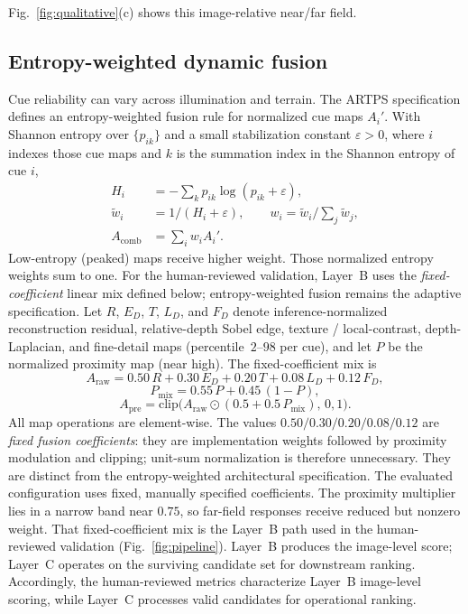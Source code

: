 Fig.~\ref{fig:qualitative}(c) shows this image-relative near/far field.

\subsection{Entropy-weighted dynamic fusion}
Cue reliability can vary across illumination and terrain.
The ARTPS specification defines an entropy-weighted fusion rule for normalized cue maps
\(A_i'\). With Shannon entropy over \(\{p_{ik}\}\) and a small stabilization constant
\(\varepsilon>0\), where \(i\) indexes those cue maps and \(k\) is the summation index in
the Shannon entropy of cue \(i\),
\[
\begin{aligned}
H_i&=-\sum_k p_{ik}\log(p_{ik}+\varepsilon),\\
\tilde w_i&=1/(H_i+\varepsilon),\qquad
w_i=\tilde w_i/\sum_j\tilde w_j,\\
A_{\mathrm{comb}}&=\sum_i w_i A_i'.
\end{aligned}
\]
Low-entropy (peaked) maps receive higher weight.
Those normalized entropy weights sum to one.
For the human-reviewed validation, Layer~B uses the \emph{fixed-coefficient} linear mix
defined below; entropy-weighted fusion remains the adaptive specification.
Let \(R\), \(E_D\), \(T\), \(L_D\), and \(F_D\) denote inference-normalized reconstruction
residual, relative-depth Sobel edge, texture / local-contrast, depth-Laplacian, and
fine-detail maps (percentile~$2$--$98$ per cue), and let \(P\) be the normalized proximity
map (near high).
The fixed-coefficient mix is
\[
A_{\mathrm{raw}}
=
0.50\,R + 0.30\,E_D + 0.20\,T + 0.08\,L_D + 0.12\,F_D,
\]
\[
P_{\mathrm{mix}}=0.55\,P+0.45\,(1-P),
\]
\[
A_{\mathrm{pre}}
=
\mathrm{clip}\!\bigl(A_{\mathrm{raw}}\odot(0.5+0.5\,P_{\mathrm{mix}}),\,0,1\bigr).
\]
All map operations are element-wise.
The values \(0.50/0.30/0.20/0.08/0.12\) are \emph{fixed fusion coefficients}: they are
implementation weights followed by proximity modulation and clipping; unit-sum normalization
is therefore unnecessary.
They are distinct from the entropy-weighted architectural specification.
The evaluated configuration uses fixed, manually specified coefficients.
The proximity multiplier lies in a narrow band near \(0.75\), so far-field responses receive
reduced but nonzero weight.
That fixed-coefficient mix is the Layer~B path used in the human-reviewed validation
(Fig.~\ref{fig:pipeline}).
Layer~B produces the image-level score; Layer~C operates on the surviving candidate set for
downstream ranking.
Accordingly, the human-reviewed metrics characterize Layer~B image-level scoring, while
Layer~C processes valid candidates for operational ranking.

